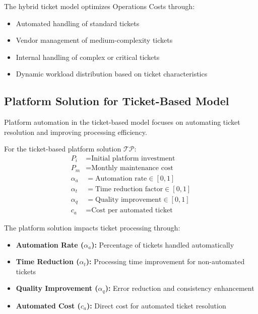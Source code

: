 \documentclass[12pt,a4paper]{article}
\newenvironment{definition}[1]
{\begin{mdframed}[style=definitionstyle,frametitle={Definition: #1}]}
{\end{mdframed}}
\newenvironment{explanation}
{\begin{mdframed}[style=explanationstyle,frametitle={Explanation}]}
{\end{mdframed}}
\begin{document}
\begin{explanation}
The hybrid ticket model optimizes Operations Costs through:
\begin{itemize}
    \item Automated handling of standard tickets
    \item Vendor management of medium-complexity tickets
    \item Internal handling of complex or critical tickets
    \item Dynamic workload distribution based on ticket characteristics
\end{itemize}
\end{explanation}

\subsection{Platform Solution for Ticket-Based Model}
Platform automation in the ticket-based model focuses on automating ticket resolution and improving processing efficiency.

\begin{definition}{Ticket Platform Variables}
For the ticket-based platform solution $\mathcal{TP}$:
\begin{align*}
    P_i &= \text{Initial platform investment} \\
    P_m &= \text{Monthly maintenance cost} \\
    \alpha_a &= \text{Automation rate} \in [0,1] \\
    \alpha_t &= \text{Time reduction factor} \in [0,1] \\
    \alpha_q &= \text{Quality improvement} \in [0,1] \\
    c_a &= \text{Cost per automated ticket}
\end{align*}
\end{definition}

\begin{explanation}
The platform solution impacts ticket processing through:
\begin{itemize}
    \item \textbf{Automation Rate ($\alpha_a$):} Percentage of tickets handled automatically
    \item \textbf{Time Reduction ($\alpha_t$):} Processing time improvement for non-automated tickets
    \item \textbf{Quality Improvement ($\alpha_q$):} Error reduction and consistency enhancement
    \item \textbf{Automated Cost ($c_a$):} Direct cost for automated ticket resolution
\end{itemize}
\end{explanation}
\end{document}

